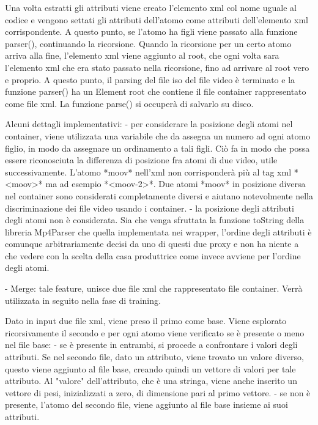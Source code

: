  Una volta estratti gli attributi viene creato l'elemento xml col nome uguale al codice e vengono settati gli attributi dell'atomo come attributi dell'elemento xml corrispondente. A questo punto, se l'atomo ha figli viene passato alla funzione parser(), continuando la ricorsione. Quando la ricorsione per un certo atomo arriva alla fine, l'elemento xml viene aggiunto al root, che ogni volta sara l'elemento xml che era stato passato nella ricorsione, fino ad arrivare al root vero e proprio. A questo punto, il parsing del file iso del file video è terminato e la funzione parser() ha un Element root che contiene il file container rappresentato come file xml. La funzione parse() si occuperà di salvarlo su disco.

 Alcuni dettagli implementativi:
 - per considerare la posizione degli atomi nel container, viene utilizzata una variabile che da assegna un numero ad ogni atomo figlio, in modo da assegnare un ordinamento a tali figli. Ciò fa in modo che possa essere riconosciuta la differenza di posizione fra atomi di due video, utile successivamente. L'atomo *moov* nell'xml non corrisponderà più al tag xml *<moov>* ma ad esempio *<moov-2>*. Due atomi *moov* in posizione diversa nel container sono considerati completamente diversi e aiutano notevolmente nella discriminazione dei file video usando i container.
 - la posizione degli attributi degli atomi non è considerata. Sia che venga sfruttata la funzione toString della libreria Mp4Parser che quella implementata nei wrapper, l'ordine degli attributi è comunque arbitrariamente decisi da uno di questi due proxy e non ha niente a che vedere con la scelta della casa produttrice come invece avviene per l'ordine degli atomi.


- Merge:
 tale feature, unisce due file xml che rappresentato file container. Verrà utilizzata in seguito nella fase di training.

 Dato in input due file xml, viene preso il primo come base. Viene esplorato ricorsivamente il secondo e per ogni atomo viene verificato se è presente o meno nel file base:
 - se è presente in entrambi, si procede a confrontare i valori degli attributi. Se nel secondo file, dato un attributo, viene trovato un valore diverso, questo viene aggiunto al file base, creando quindi un vettore di valori per tale attributo. Al "valore" dell'attributo, che è una stringa, viene anche inserito un vettore di pesi, inizializzati a zero, di dimensione pari al primo vettore.
 - se non è presente, l'atomo del secondo file, viene aggiunto al file base insieme ai suoi attributi.

